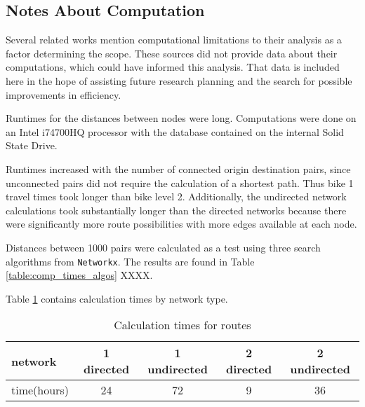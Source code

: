 \subsection{Notes About Computation}

Several related works mention computational limitations to their analysis as a factor determining the scope. These sources did not provide data about their computations, which could have informed this analysis. That data is included here in the hope of assisting future research planning and the search for possible improvements in efficiency. 

Runtimes for the distances between nodes were long. Computations were done on an Intel i74700HQ processor with the database contained on the internal Solid State Drive. 

Runtimes increased with the number of connected origin destination pairs, since unconnected pairs  did not require the calculation of a shortest path. Thus bike 1 travel times took longer than bike level 2. Additionally, the undirected network calculations took substantially longer than the directed networks because there were significantly more route possibilities with more edges available at each node. 

Distances between 1000 pairs were calculated as a test using three search algorithms from \texttt{Networkx}. The results are found in Table \ref{table:comp_times_algos} XXXX. 

Table \ref{table:net_calc_times} contains calculation times by network type. 

\begin{table}[]
\centering
\begin{tabular}{@{}lcccc@{}}
network     & 1 directed  & 1 undirected & 2 directed  & 2 undirected \\ 
\midrule
time(hours) & 24 & 72  & 9 & 36 \\ \bottomrule
\end{tabular}
\caption{Calculation times for routes}
\label{table:net_calc_times}
\end{table}

